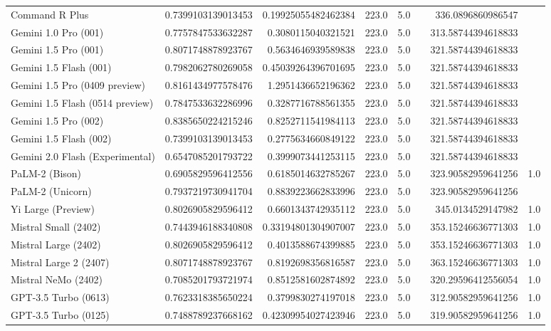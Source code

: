 \begin{table}[htp]
{\begin{tabular}{lrrrrrrr}
Command R Plus & 0.7399103139013453 & 0.19925055482462384 & 223.0 & 5.0 &  & 336.0896860986547 &  \\
Gemini 1.0 Pro (001) & 0.7757847533632287 & 0.3080115040321521 & 223.0 & 5.0 &  & 313.58744394618833 &  \\
Gemini 1.5 Pro (001) & 0.8071748878923767 & 0.5634646939589838 & 223.0 & 5.0 &  & 321.58744394618833 &  \\
Gemini 1.5 Flash (001) & 0.7982062780269058 & 0.45039264396701695 & 223.0 & 5.0 &  & 321.58744394618833 &  \\
Gemini 1.5 Pro (0409 preview) & 0.8161434977578476 & 1.2951436652196362 & 223.0 & 5.0 &  & 321.58744394618833 &  \\
Gemini 1.5 Flash (0514 preview) & 0.7847533632286996 & 0.3287716788561355 & 223.0 & 5.0 &  & 321.58744394618833 &  \\
Gemini 1.5 Pro (002) & 0.8385650224215246 & 0.8252711541984113 & 223.0 & 5.0 &  & 321.58744394618833 &  \\
Gemini 1.5 Flash (002) & 0.7399103139013453 & 0.2775634660849122 & 223.0 & 5.0 &  & 321.58744394618833 &  \\
Gemini 2.0 Flash (Experimental) & 0.6547085201793722 & 0.3999073441253115 & 223.0 & 5.0 &  & 321.58744394618833 &  \\
PaLM-2 (Bison) & 0.6905829596412556 & 0.6185014632785267 & 223.0 & 5.0 &  & 323.90582959641256 & 1.0 \\
PaLM-2 (Unicorn) & 0.7937219730941704 & 0.8839223662833996 & 223.0 & 5.0 &  & 323.90582959641256 &  \\
Yi Large (Preview) & 0.8026905829596412 & 0.6601343742935112 & 223.0 & 5.0 &  & 345.0134529147982 & 1.0 \\
Mistral Small (2402) & 0.7443946188340808 & 0.33194801304907007 & 223.0 & 5.0 &  & 353.15246636771303 & 1.0 \\
Mistral Large (2402) & 0.8026905829596412 & 0.4013588674399885 & 223.0 & 5.0 &  & 353.15246636771303 & 1.0 \\
Mistral Large 2 (2407) & 0.8071748878923767 & 0.8192698356816587 & 223.0 & 5.0 &  & 363.15246636771303 & 1.0 \\
Mistral NeMo (2402) & 0.7085201793721974 & 0.8512581602874892 & 223.0 & 5.0 &  & 320.29596412556054 & 1.0 \\
GPT-3.5 Turbo (0613) & 0.7623318385650224 & 0.3799830274197018 & 223.0 & 5.0 &  & 312.90582959641256 & 1.0 \\
GPT-3.5 Turbo (0125) & 0.7488789237668162 & 0.42309954027423946 & 223.0 & 5.0 &  & 319.90582959641256 & 1.0 \\

\end{tabular}}
\end{table}
